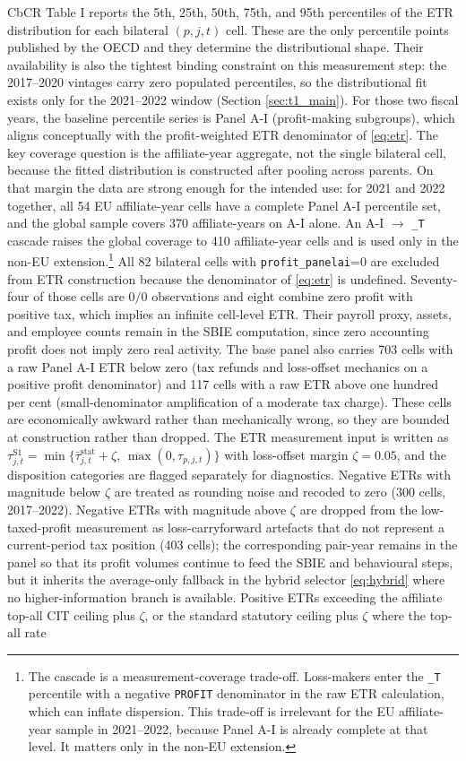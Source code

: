 \documentclass[11pt,a4paper]{article}
\newcommand{\code}[1]{\texttt{#1}}
\begin{document}
CbCR Table I reports the 5th, 25th, 50th, 75th, and 95th percentiles of the ETR distribution for each bilateral $(p, j, t)$ cell. These are the only percentile points published by the OECD and they determine the distributional shape. Their availability is also the tightest binding constraint on this measurement step: the 2017--2020 vintages carry zero populated percentiles, so the distributional fit exists only for the 2021--2022 window (Section \ref{sec:t1_main}). For those two fiscal years, the baseline percentile series is Panel A-I (profit-making subgroups), which aligns conceptually with the profit-weighted ETR denominator of \eqref{eq:etr}. The key coverage question is the affiliate-year aggregate, not the single bilateral cell, because the fitted distribution is constructed after pooling across parents. On that margin the data are strong enough for the intended use: for 2021 and 2022 together, all 54 EU affiliate-year cells have a complete Panel A-I percentile set, and the global sample covers 370 affiliate-years on A-I alone. An A-I $\rightarrow$ \code{\_T} cascade raises the global coverage to 410 affiliate-year cells and is used only in the non-EU extension.\footnote{The cascade is a measurement-coverage trade-off. Loss-makers enter the \code{\_T} percentile with a negative \code{PROFIT} denominator in the raw ETR calculation, which can inflate dispersion. This trade-off is irrelevant for the EU affiliate-year sample in 2021--2022, because Panel A-I is already complete at that level. It matters only in the non-EU extension.} All 82 bilateral cells with \code{profit\_panelai}=0 are excluded from ETR construction because the denominator of \eqref{eq:etr} is undefined. Seventy-four of those cells are $0/0$ observations and eight combine zero profit with positive tax, which implies an infinite cell-level ETR. Their payroll proxy, assets, and employee counts remain in the SBIE computation, since zero accounting profit does not imply zero real activity. The base panel also carries 703 cells with a raw Panel A-I ETR below zero (tax refunds and loss-offset mechanics on a positive profit denominator) and 117 cells with a raw ETR above one hundred per cent (small-denominator amplification of a moderate tax charge). These cells are economically awkward rather than mechanically wrong, so they are bounded at construction rather than dropped. The ETR measurement input is written as $\tau_{j,t}^{\text{S1}} = \min\{\bar{\tau}_{j,t}^{\text{stat}} + \zeta,\,\max(0,\tau_{p,j,t})\}$ with loss-offset margin $\zeta = 0.05$, and the disposition categories are flagged separately for diagnostics. Negative ETRs with magnitude below $\zeta$ are treated as rounding noise and recoded to zero (300 cells, 2017--2022). Negative ETRs with magnitude above $\zeta$ are dropped from the low-taxed-profit measurement as loss-carryforward artefacts that do not represent a current-period tax position (403 cells); the corresponding pair-year remains in the panel so that its profit volumes continue to feed the SBIE and behavioural steps, but it inherits the average-only fallback in the hybrid selector \eqref{eq:hybrid} where no higher-information branch is available. Positive ETRs exceeding the affiliate top-all CIT ceiling plus $\zeta$, or the standard statutory ceiling plus $\zeta$ where the top-all rate 
\end{document}
